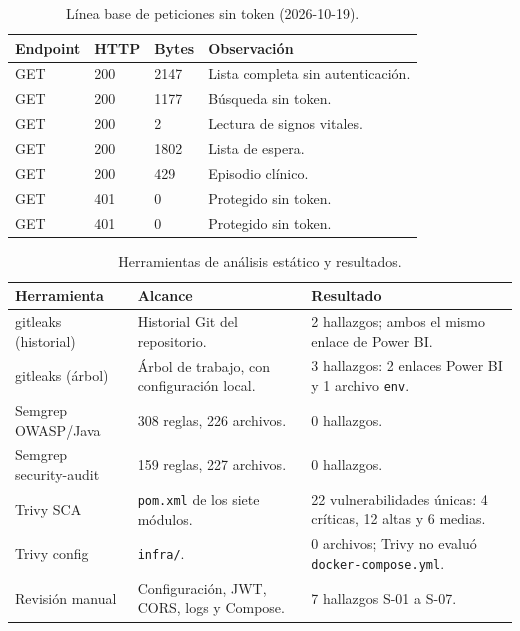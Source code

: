 \begin{table}[htbp]
\centering
\caption{Línea base de peticiones sin token (2026-10-19).}
\label{tab:baseline}
\small
\setlength{\tabcolsep}{4pt}
\begin{tabular}{@{}L{9.0cm}C{1.3cm}C{1.5cm}L{3.4cm}@{}}
\toprule
\textbf{Endpoint} & \textbf{HTTP} & \textbf{Bytes} & \textbf{Observación}\\
\midrule
GET  & 200 & 2147 & Lista completa sin autenticación.\\
GET  & 200 & 1177 & Búsqueda sin token.\\
GET  & 200 & 2 & Lectura de signos vitales.\\
GET  & 200 & 1802 & Lista de espera.\\
GET  & 200 & 429 & Episodio clínico.\\
GET  & 401 & 0 & Protegido sin token.\\
GET  & 401 & 0 & Protegido sin token.\\
\bottomrule
\end{tabular}
\end{table}

\begin{table}[htbp]
\centering
\caption{Herramientas de análisis estático y resultados.}
\label{tab:estatico}
\small
\setlength{\tabcolsep}{4pt}
\begin{tabular}{@{}L{4.1cm}L{6.7cm}L{4.5cm}@{}}
\toprule
\textbf{Herramienta} & \textbf{Alcance} & \textbf{Resultado}\\
\midrule
gitleaks (historial) & Historial Git del repositorio. & 2 hallazgos; ambos el mismo enlace de Power BI.\\
gitleaks (árbol) & Árbol de trabajo, con configuración local. & 3 hallazgos: 2 enlaces Power BI y 1 archivo \texttt{env}.\\
Semgrep OWASP/Java & 308 reglas, 226 archivos. & 0 hallazgos.\\
Semgrep security-audit & 159 reglas, 227 archivos. & 0 hallazgos.\\
Trivy SCA & \texttt{pom.xml} de los siete módulos. & 22 vulnerabilidades únicas: 4 críticas, 12 altas y 6 medias.\\
Trivy config & \texttt{infra/}. & 0 archivos; Trivy no evaluó \texttt{docker-compose.yml}.\\
Revisión manual & Configuración, JWT, CORS, logs y Compose. & 7 hallazgos S-01 a S-07.\\
\bottomrule
\end{tabular}
\end{table}

